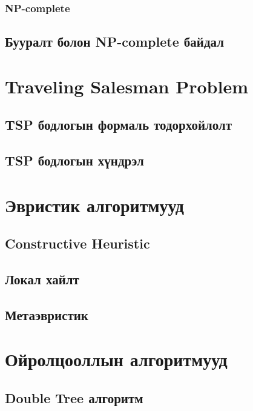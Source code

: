\subsubsection{NP-complete}

\subsection{Бууралт болон NP-complete байдал}

\section{Traveling Salesman Problem}

\subsection{TSP бодлогын формаль тодорхойлолт}

\subsection{TSP бодлогын хүндрэл}

\section{Эвристик алгоритмууд}

\subsection{Constructive Heuristic}

\subsection{Локал хайлт}

\subsection{Метаэвристик}

\section{Ойролцооллын алгоритмууд}

\subsection{Double Tree алгоритм}

